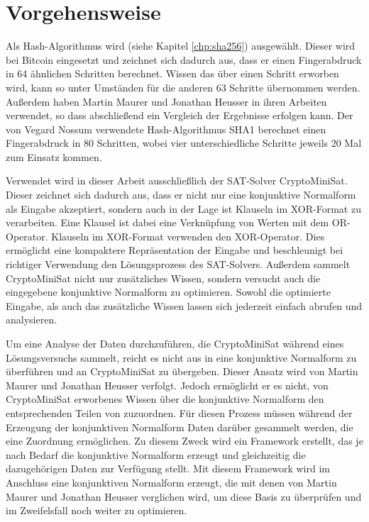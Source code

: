\section{Vorgehensweise}

Als Hash-Algorithmus wird  (siehe Kapitel \ref{chp:sha256}) ausgewählt. Dieser wird bei Bitcoin eingesetzt
und zeichnet sich dadurch aus, dass er einen Fingerabdruck in 64 ähnlichen Schritten berechnet. Wissen das über einen Schritt
erworben wird, kann so unter Umständen für die anderen 63 Schritte übernommen werden. Außerdem haben Martin Maurer und Jonathan
Heusser  in ihren Arbeiten verwendet, so dass abschließend ein Vergleich der Ergebnisse erfolgen kann. Der von Vegard Nossum
verwendete Hash-Algorithmus SHA1 berechnet einen Fingerabdruck in 80 Schritten, wobei vier unterschiedliche Schritte jeweils 20 Mal
zum Einsatz kommen.

Verwendet wird in dieser Arbeit ausschließlich der SAT-Solver CryptoMiniSat. Dieser zeichnet sich dadurch aus, dass er nicht nur
eine konjunktive Normalform als Eingabe akzeptiert, sondern auch in der Lage ist Klauseln im XOR-Format zu verarbeiten. Eine Klausel
ist dabei eine Verknüpfung von Werten mit dem OR-Operator. Klauseln im XOR-Format verwenden den XOR-Operator. Dies ermöglicht
eine kompaktere Repräsentation der Eingabe und beschleunigt bei richtiger Verwendung den Lösungsprozess des SAT-Solvers.
Außerdem sammelt CryptoMiniSat nicht nur zusätzliches Wissen, sondern versucht auch die eingegebene konjunktive Normalform zu
optimieren. Sowohl die optimierte Eingabe, als auch das zusätzliche Wissen lassen sich jederzeit einfach abrufen und analysieren.

Um eine Analyse der Daten durchzuführen, die CryptoMiniSat während eines Lösungsversuchs sammelt, reicht es nicht aus 
in eine konjunktive Normalform zu überführen und an CryptoMiniSat zu übergeben. Dieser Ansatz wird von Martin Maurer und Jonathan
Heusser verfolgt. Jedoch ermöglicht er es nicht, von CryptoMiniSat erworbenes Wissen über die konjunktive Normalform den
entsprechenden Teilen von  zuzuordnen. Für diesen Prozess müssen während der Erzeugung der konjunktiven Normalform
Daten darüber gesammelt werden, die eine Zuordnung ermöglichen. Zu diesem Zweck wird ein Framework erstellt, das je nach Bedarf
die konjunktive Normalform erzeugt und gleichzeitig die dazugehörigen Daten zur Verfügung stellt. Mit diesem Framework wird
im Anschluss eine konjunktiven Normalform erzeugt, die mit denen von Martin Maurer und Jonathan Heusser
verglichen wird, um diese Basis zu überprüfen und im Zweifelsfall noch weiter zu optimieren.

